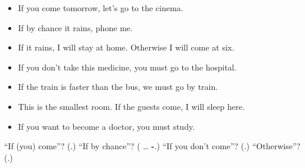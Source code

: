 \begin{itemize}
\raggedright
  \item If you come tomorrow, let's go to the cinema.
  \item If by chance it rains, phone me.
  \item If it rains, I will stay at home. Otherwise I will come at six.
  \item If you don't take this medicine, you must go to the hospital.
  \item If the train is faster than the bus, we must go by train.
  \item This is the smallest room. If the guests come, I will sleep here.
  \item If you want to become a doctor, you must study.
\end{itemize}

\begin{tcolorbox}[breakable,colback=teal!4,colframe=teal!35!black,title={Before you move on}]
\textquotedblleft{}If (you) come\textquotedblright{}? (\textbf{}.) \textquotedblleft{}If by chance\textquotedblright{}? (\textbf{ } … \textbf{-}.) \textquotedblleft{}If you don't come\textquotedblright{}? (\textbf{}.) \textquotedblleft{}Otherwise\textquotedblright{}? (\textbf{}.)
\end{tcolorbox}
